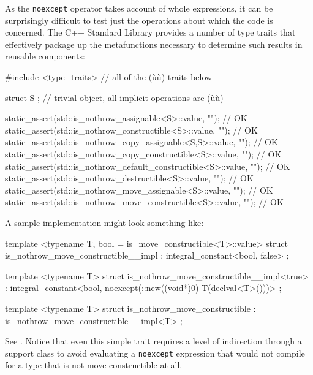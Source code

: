 As the \lstinline!noexcept! operator takes account of whole expressions, it
can be surprisingly difficult to test just the operations about which
the code is concerned. The C++ Standard Library provides a number of
type traits that effectively package up the metafunctions necessary to
determine such results in reusable components:

\begin{emcppslisting}
#include <type_traits>  // all of the (ù{}ù) traits below

struct S { };  // trivial object, all implicit operations are (ù{}ù)

static_assert(std::is_nothrow_assignable<S>::value, "");             // OK
static_assert(std::is_nothrow_constructible<S>::value, "");          // OK
static_assert(std::is_nothrow_copy_assignable<S,S>::value, "");      // OK
static_assert(std::is_nothrow_copy_constructible<S>::value, "");     // OK
static_assert(std::is_nothrow_default_constructible<S>::value, "");  // OK
static_assert(std::is_nothrow_destructible<S>::value, "");           // OK
static_assert(std::is_nothrow_move_assignable<S>::value, "");        // OK
static_assert(std::is_nothrow_move_constructible<S>::value, "");     // OK
\end{emcppslisting}
    

\noindent A sample implementation might look something like:

\begin{emcppslisting}
template <typename T, bool = is_move_constructible<T>::value>
struct is_nothrow_move_constructible__impl
    : integral_constant<bool, false> { };

template <typename T>
struct is_nothrow_move_constructible__impl<true>
    : integral_constant<bool, noexcept(::new((void*)0) T(declval<T>()))> { };

template <typename T>
struct is_nothrow_move_constructible
    : is_nothrow_move_constructible__impl<T> { };
\end{emcppslisting}
    

\noindent See . Notice that even this
simple trait requires a level of indirection through a support class to
avoid evaluating a \lstinline!noexcept! expression that would not compile
for a type that is not move constructible at all.

